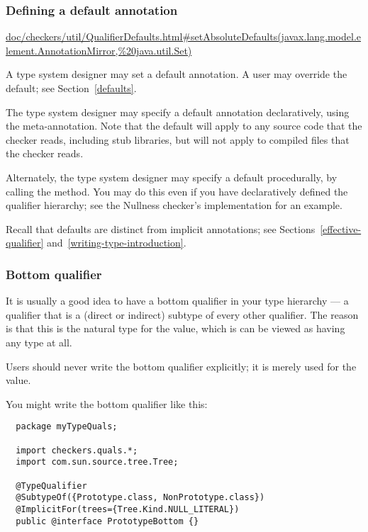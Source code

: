 \subsubsection{Defining a default annotation\label{typesystem-defaults}}


\urldef{\setAbsoluteDefaultsURL}\url{doc/checkers/util/QualifierDefaults.html#setAbsoluteDefaults(javax.lang.model.element.AnnotationMirror,%20java.util.Set)}

A type system designer may set a default annotation.  A user may override
the default; see Section~\ref{defaults}.

The type system designer may specify a default annotation declaratively,
using the 
meta-annotation.
Note that the default will apply to any source code that the checker reads,
including stub libraries, but will not apply to compiled 
files that the checker reads.

Alternately, the type system designer may specify a default procedurally,
by calling the
method.  You may do this even if you have declaratively defined the
qualifier hierarchy; see the Nullness checker's implementation for an
example.


Recall that defaults are distinct
from implicit annotations; see Sections~\ref{effective-qualifier}
and~\ref{writing-type-introduction}.


\subsubsection{Bottom qualifier\label{bottom-qualifier}}

It is usually a good idea to have a bottom qualifier in your type hierarchy
--- a qualifier that is a (direct or indirect) subtype of every other
qualifier.  The reason is that this is the natural type for the 
value, which is can be viewed as having any type at all.

Users should never write the bottom qualifier explicitly; it is merely used
for the  value.

You might write the bottom qualifier like this:

\begin{Verbatim}
  package myTypeQuals;

  import checkers.quals.*;
  import com.sun.source.tree.Tree;

  @TypeQualifier
  @SubtypeOf({Prototype.class, NonPrototype.class})
  @ImplicitFor(trees={Tree.Kind.NULL_LITERAL})
  public @interface PrototypeBottom {}
\end{Verbatim}



